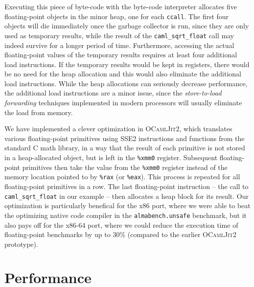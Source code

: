 \documentclass[12pt,a4paper,final]{article}
\begin{document}
Executing this piece of byte-code with the byte-code interpreter allocates five
floating-point objects in the minor heap, one for each \texttt{ccall}. The first
four objects will die immediately once the garbage collector is run, since they
are only used as temporary results, while the result of the \texttt{caml\_sqrt\_float}
call may indeed survive for a longer period of time. Furthermore, accessing the
actual floating-point values of the temporary results requires at least four
additional load instructions.
If the temporary results would be kept in registers, there would be no need for
the heap allocation and this would also eliminate the additional load instructions.
While the heap allocations can seriously decrease performance, the additional
load instructions are a minor issue, since the \emph{store-to-load forwarding}
techniques \cite{Austin95,Lipasti96} implemented in modern processors will usually
eliminate the load from memory.

We have implemented a clever optimization in \textsc{OCamlJit2}, which translates
various floating-point primitives using SSE2 instructions and functions from the
standard C math library, in a way that the result of each primitive is not stored in
a heap-allocated object, but is left in the \texttt{\%xmm0} register. Subsequent
floating-point primitives then take the value from the \texttt{\%xmm0} register
instead of the memory location pointed to by \texttt{\%rax} (or \texttt{\%eax}).
This process is repeated for all floating-point primitives in a row. The last
floating-point instruction -- the call to \texttt{caml\_sqrt\_float} in our
example -- then allocates a heap block for its result.
Our optimization is particularly benefical for the x86 port, where we were able
to beat the optimizing native code compiler in the \texttt{almabench.unsafe}
benchmark, but it also pays off for the x86-64 port, where we could reduce the
execution time of floating-point benchmarks by up to $30\%$ (compared to the
earlier \textsc{OCamlJit2} prototype).


\section{Performance} \label{section:Performance}
\end{document}
